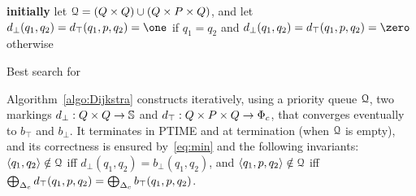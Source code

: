 
\begin{algorithm}

\textbf{initially} let $\mathcal{Q} = (Q \times Q) \cup (Q \times P \times Q)$,
and let $d_\bot(q_1, q_2) = d_\top(q_1, p, q_2) = \one$
if $q_1 = q_2$ and $d_\bot(q_1, q_2) = d_\top(q_1, p, q_2) = \zero$ otherwise$\;$

\smallskip\noindent
{}
\caption{Best search for \SWVPA}
\label{algo:Dijkstra}
\end{algorithm}

Algorithm~\ref{algo:Dijkstra}
constructs iteratively,
using a priority queue $\mathcal{Q}$, 
two markings
$d_\bot : Q \times Q \to \mathbb{S}$ and
$d_\top : Q \times P \times Q \to \Phic$,
that converges eventually to $b_\top$ and $b_\bot$. 
%
%
It terminates in PTIME and at termination (when $\mathcal{Q}$ is empty), 
and its correctness is ensured by~\eqref{eq:min} and  
the following invariants: 
$\< q_1, q_2> \notin \Q$ iff $d_\bot(q_1, q_2) = b_\bot(q_1, q_2)$, 
and $\< q_1, p, q_2> \notin \Q$ iff 
$\bigoplus_{\Deltac} d_\top(q_1, p, q_2) = \bigoplus_{\Deltac} b_\top(q_1, p, q_2)$.

